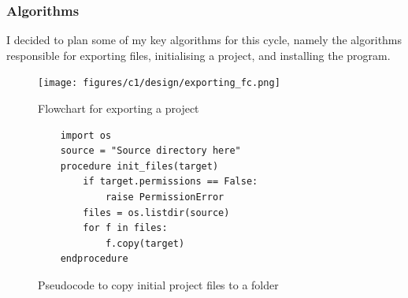 \documentclass[11pt]{article}
\begin{document}
            \subsubsection{Algorithms}
                I decided to plan some of my key algorithms for this cycle, namely the algorithms responsible for exporting files, initialising a project, and installing the program.

                \begin{figure}[!ht]
                    \centering
                    \texttt{[image: figures/c1/design/exporting\_fc.png]}
                    \caption{Flowchart for exporting a project}
                    \label{fig:exporting_fc_c1}
                \end{figure}


                

                \begin{figure}[!ht]
                    \begin{verbatim}
    import os
    source = "Source directory here"
    procedure init_files(target)
        if target.permissions == False:
            raise PermissionError
        files = os.listdir(source)
        for f in files:
            f.copy(target)
    endprocedure
                    \end{verbatim}
                    \caption{Pseudocode to copy initial project files to a folder}
                    \label{pc:copy_to_folder_ps_c1}
                \end{figure}
\end{document}
